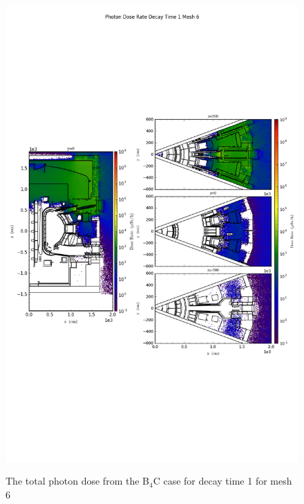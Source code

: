 \begin{figure}[ht!]
\centering
\includegraphics[trim={0cm 9cm 0cm 10cm},clip,scale=0.75]{../plots/final_model_nob4c/Photon_Dose_Rate_Decay_Time_1_Mesh_6.png}
\label{fig:photons_dc1_no4bc_m6_flux}
\caption{The total photon dose from the B$_4$C case for decay time 1 for mesh 6}
\end{figure}
